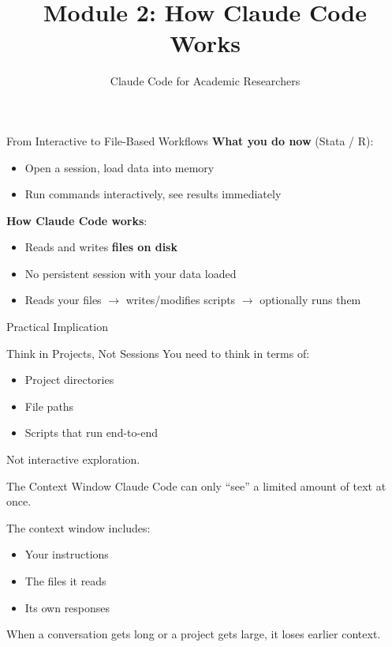 \documentclass[aspectratio=169, 11pt]{beamer}
\title{Module 2: How Claude Code Works}
\subtitle{Claude Code for Academic Researchers}
\author{} %
\date{}
\institute{}
\begin{document}
\begin{frame}[plain]
  \titlepage
\end{frame}


\begin{frame}{From Interactive to File-Based Workflows}
  \textbf{What you do now} (Stata / R):
  \begin{itemize}
    \item Open a session, load data into memory
    \item Run commands interactively, see results immediately
  \end{itemize}

  \vspace{0.8em}
  \textbf{How Claude Code works}:
  \begin{itemize}
    \item Reads and writes \textbf{files on disk}
    \item No persistent session with your data loaded
    \item Reads your files $\rightarrow$ writes/modifies scripts $\rightarrow$ optionally runs them
  \end{itemize}
\end{frame}

\begin{frame}{Practical Implication}
  \begin{alertblock}{Think in Projects, Not Sessions}
    You need to think in terms of:
    \begin{itemize}
      \item Project directories
      \item File paths
      \item Scripts that run end-to-end
    \end{itemize}
    Not interactive exploration.
  \end{alertblock}
\end{frame}


\begin{frame}{The Context Window}
  Claude Code can only ``see'' a limited amount of text at once.

  \vspace{0.5em}
  The context window includes:
  \begin{itemize}
    \item Your instructions
    \item The files it reads
    \item Its own responses
  \end{itemize}

  \vspace{0.8em}
  \alert{When a conversation gets long or a project gets large, it loses earlier context.}
\end{frame}
\end{document}
